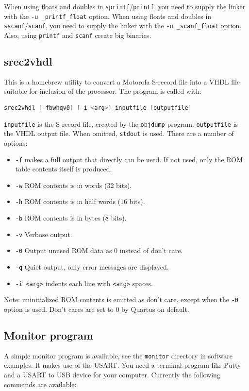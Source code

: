 \documentclass[12pt]{article}
\begin{document}
When using floats and doubles in \texttt{sprintf}/\texttt{printf}, you need to supply the linker with the \lstinline|-u _printf_float| option. When using floats and doubles in \texttt{sscanf}/\texttt{scanf}, you need to supply the linker with the \lstinline|-u _scanf_float| option. Also, using \texttt{printf} and \texttt{scanf} create big binaries.

\subsection{srec2vhdl}
This is a homebrew utility to convert a Motorola S-record file into a VHDL file suitable for inclusion of the processor. The program is called with:

\begin{lstlisting}[language=c]
srec2vhdl [-fbwhqv0] [-i <arg>] inputfile [outputfile]
\end{lstlisting}

\texttt{inputfile} is the S-record file, created by the \texttt{objdump} program. \texttt{outputfile} is the VHDL output file. When omitted, \texttt{stdout} is used. There are a number of options:

\begin{itemize}
\item \texttt{-f} makes a full output that directly can be used. If not used, only the ROM table contents itself is produced.
\item \texttt{-w} ROM contents is in words (32 bits).
\item \texttt{-h} ROM contents is in half words (16 bits).
\item \texttt{-b} ROM contents is in bytes (8 bits).
\item \texttt{-v} Verbose output.
\item \texttt{-0} Output unused ROM data as 0 instead of don't care.
\item \texttt{-q} Quiet output, only error messages are displayed.
\item \texttt{-i <arg>} indents each line with \texttt{<arg>} spaces.
\end{itemize}

Note: uninitialized ROM contents is emitted as don't care, except when the \texttt{-0} option is used. Don't cares are set to 0 by Quartus on default.

\subsection{Monitor program}
A simple monitor program is available, see the \texttt{monitor} directory in software examples. It makes use of the USART. You need a terminal program like Putty and a USART to USB device for your computer. Currently the following commands are available:
\end{document}
